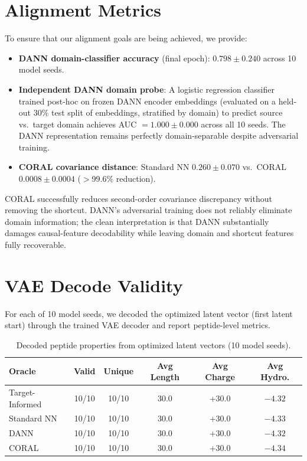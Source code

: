\documentclass{article}
\begin{document}
\section{Alignment Metrics} \label{sec:alignment}
To ensure that our alignment goals are being achieved, we provide:
\begin{itemize}
    \item \textbf{DANN domain-classifier accuracy} (final epoch): $0.798 \pm 0.240$ across 10 model seeds.
    \item \textbf{Independent DANN domain probe}: A logistic regression classifier trained post-hoc on frozen DANN encoder embeddings (evaluated on a held-out 30\% test split of embeddings, stratified by domain) to predict source vs.\ target domain achieves AUC $= 1.000 \pm 0.000$ across all 10 seeds. The DANN representation remains perfectly domain-separable despite adversarial training.
    \item \textbf{CORAL covariance distance}: Standard NN $0.260 \pm 0.070$ vs.\ CORAL $0.0008 \pm 0.0004$ ($>$99.6\% reduction).
\end{itemize}
CORAL successfully reduces second-order covariance discrepancy without removing the shortcut. DANN's adversarial training does not reliably eliminate domain information; the clean interpretation is that DANN substantially damages causal-feature decodability while leaving domain and shortcut features fully recoverable.

\section{VAE Decode Validity} \label{sec:vae_validity}
For each of 10 model seeds, we decoded the optimized latent vector (first latent start) through the trained VAE decoder and report peptide-level metrics.

\begin{table}[H]
\centering
\caption{Decoded peptide properties from optimized latent vectors (10 model seeds).}
\label{tab:vae_validity}
\begin{tabular}{lccccc}
\toprule
Oracle & Valid & Unique & Avg Length & Avg Charge & Avg Hydro. \\
\midrule
Target-Informed & 10/10 & 10/10 & 30.0 & +30.0 & $-4.32$ \\
Standard NN & 10/10 & 10/10 & 30.0 & +30.0 & $-4.33$ \\
DANN & 10/10 & 10/10 & 30.0 & +30.0 & $-4.32$ \\
CORAL & 10/10 & 10/10 & 30.0 & +30.0 & $-4.34$ \\
\bottomrule
\end{tabular}
\end{table}
\end{document}
